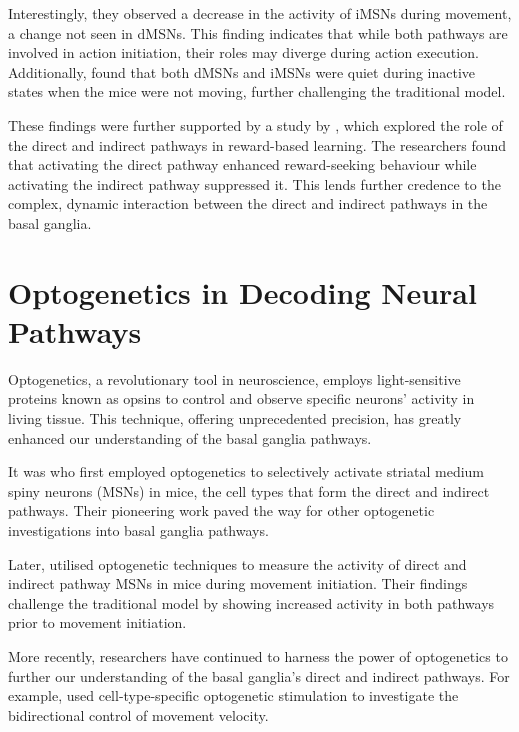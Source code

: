 \documentclass[10pt]{article}
\begin{document}
\begin{sloppypar}
  Interestingly, they observed a decrease in the activity of iMSNs during movement, a change not seen in dMSNs. This finding indicates that while both pathways are involved in action initiation, their roles may diverge during action execution. Additionally, \cite{cui_concurrent_2013} found that both dMSNs and iMSNs were quiet during inactive states when the mice were not moving, further challenging the traditional model.

  These findings were further supported by a study by \cite{guillaumin_experimental_2021}, which explored the role of the direct and indirect pathways in reward-based learning. The researchers found that activating the direct pathway enhanced reward-seeking behaviour while activating the indirect pathway suppressed it. This lends further credence to the complex, dynamic interaction between the direct and indirect pathways in the basal ganglia.

  \section{Optogenetics in Decoding Neural Pathways}
  \label{sec:the-role-of-optogenetics-in-neural-pathways}

  Optogenetics, a revolutionary tool in neuroscience, employs light-sensitive proteins known as opsins to control and observe specific neurons’ activity in living tissue. This technique, offering unprecedented precision, has greatly enhanced our understanding of the basal ganglia pathways.

  It was \cite{kravitz_regulation_2010} who first employed optogenetics to selectively activate striatal medium spiny neurons (MSNs) in mice, the cell types that form the direct and indirect pathways. Their pioneering work paved the way for other optogenetic investigations into basal ganglia pathways.

  Later, \cite{cui_concurrent_2013} utilised optogenetic techniques to measure the activity of direct and indirect pathway MSNs in mice during movement initiation. Their findings challenge the traditional model by showing increased activity in both pathways prior to movement initiation.

  More recently, researchers have continued to harness the power of optogenetics to further our understanding of the basal ganglia’s direct and indirect pathways. For example, \cite{yttri_opponent_2016} used cell-type-specific optogenetic stimulation to investigate the bidirectional control of movement velocity.


\end{sloppypar}
\end{document}
